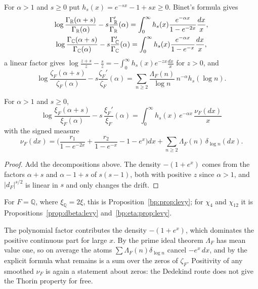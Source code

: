 For $\alpha>1$ and $s\ge0$ put $h_s(x)=e^{-sx}-1+sx\ge0$. Binet's formula gives
\begin{gather*}
\log\frac{\Gamma_{\mathbb{R}}(\alpha+s)}{\Gamma_{\mathbb{R}}(\alpha)}-s\frac{\Gamma_{\mathbb{R}}'}{\Gamma_{\mathbb{R}}}(\alpha)=\int_0^\infty h_s(x)\frac{e^{-\alpha x}}{1-e^{-2x}}\frac{dx}x,\\
\log\frac{\Gamma_{\mathbb{C}}(\alpha+s)}{\Gamma_{\mathbb{C}}(\alpha)}-s\frac{\Gamma_{\mathbb{C}}'}{\Gamma_{\mathbb{C}}}(\alpha)=\int_0^\infty h_s(x)\frac{e^{-\alpha x}}{1-e^{-x}}\frac{dx}x,
\end{gather*}
a linear factor gives $\log\frac{z+s}z-\frac sz=-\int_0^\infty h_s(x)e^{-zx}\frac{dx}x$ for $z>0$, and
\[
\log\frac{\zeta_F(\alpha+s)}{\zeta_F(\alpha)}-s\frac{\zeta_F'}{\zeta_F}(\alpha)=\sum_{n\ge2}\frac{\Lambda_F(n)}{\log n}\,n^{-\alpha}h_s(\log n).
\]

\begin{proposition}\label{gl:prop:levyF}
For $\alpha>1$ and $s\ge0$,
\begin{equation}\label{gl:eq:levyF}
\log\frac{\xi_F(\alpha+s)}{\xi_F(\alpha)}-s\,\frac{\xi_F'}{\xi_F}(\alpha)=\int_0^\infty h_s(x)\,e^{-\alpha x}\,\frac{\nu_F(dx)}x
\end{equation}
with the signed measure
\begin{equation}\label{gl:eq:nuF}
\nu_F(dx)=\Big(\frac{r_1}{1-e^{-2x}}+\frac{r_2}{1-e^{-x}}-1-e^x\Big)dx+\sum_{n\ge2}\Lambda_F(n)\,\delta_{\log n}(dx).
\end{equation}
\end{proposition}

\begin{proof}
Add the decompositions above. The density $-(1+e^x)$ comes from the factors $\alpha+s$ and $\alpha-1+s$ of $s(s-1)$, both with positive $z$ since $\alpha>1$, and $|d_F|^{s/2}$ is linear in $s$ and only changes the drift.
\end{proof}

For $F=\mathbb Q$, where $\xi_{\mathbb Q}=2\xi$, this is Proposition~\ref{bp:prop:levy}; for $\chi_4$ and $\chi_{12}$ it is Propositions~\ref{prop:dbeta:levy} and~\ref{bp:eta:prop:levy}.

\begin{remark}
The polynomial factor contributes the density $-(1+e^x)$, which dominates the positive continuous part for large $x$. By the prime ideal theorem $\Lambda_F$ has mean value one, so on average the atoms $\sum\Lambda_F(n)\delta_{\log n}$ cancel $-e^x\,dx$, and by the explicit formula what remains is a sum over the zeros of $\zeta_F$. Positivity of any smoothed $\nu_F$ is again a statement about zeros: the Dedekind route does not give the Thorin property for free.
\end{remark}


